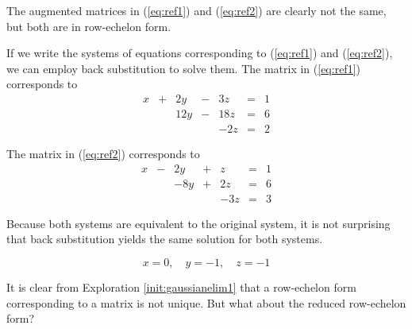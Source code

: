 \documentclass{ximera}
\begin{document}
\begin{exploration}
The augmented matrices in (\ref{eq:ref1}) and (\ref{eq:ref2}) are clearly not the same, but both are in row-echelon form.

If we write the systems of equations corresponding to (\ref{eq:ref1}) and (\ref{eq:ref2}), we can employ back substitution to solve them.  The matrix in (\ref{eq:ref1}) corresponds to
$$\begin{array}{ccccccccc}
      x &+ &2y&-&3z&= &1 \\
	 & &12y&-&18z&=&6\\
      &&&&-2z&=&2
    \end{array}$$
    
The matrix in (\ref{eq:ref2}) corresponds to    
$$\begin{array}{ccccccccc}
      x &- &2y&+&z&= &1 \\
	 & &-8y&+&2z&=&6\\
      &&&&-3z&=&3
    \end{array}$$
    
Because both systems are equivalent to the original system, it is not surprising that back substitution yields the same solution for both systems. 

$$x=0,\quad y=-1,\quad z=-1$$

\end{exploration}

It is clear from Exploration \ref{init:gaussianelim1} that a row-echelon form corresponding to a matrix is not unique.  But what about the reduced row-echelon form?
\end{document}
